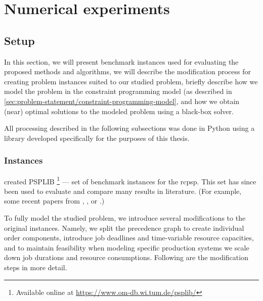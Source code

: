 \chapter{Numerical experiments} \label{chap:numerical-experiments}

\section{Setup} \label{sec:numerical-experiments/setup}

In this section, we will present benchmark instances used for evaluating the proposed methods and algorithms,
we will describe the modification process for creating problem instances suited to our studied problem,
briefly describe how we model the problem in the constraint programming model
(as described in \cref{sec:problem-statement/constraint-programming-model},
and how we obtain (near) optimal solutions to the modeled problem using a black-box solver.

All processing described in the following subsections was done in Python using a library
developed specifically for the purposes of this thesis. 

\subsection{Instances} \label{subsec:numerical-experiments/setup/instances}

\citet{Kolisch1997} created PSPLIB%
\footnote{Available online at \url{https://www.om-db.wi.tum.de/psplib/}}
--- set of benchmark instances for the \ac{rcpsp}.
This set has since been used to evaluate and compare many results in literature.
(For example, some recent papers from \citet{Bianco2011}, \citet{Cheng2015}, or \citet{Elsayed2017}.)


To fully model the studied problem, we introduce several modifications to the original instances.
Namely, we split the precedence graph to create individual order components,
introduce job deadlines and time-variable resource capacities,
and to maintain feasibility when modeling specific production systems
we scale down job durations and resource consumptions.
Following are the modification steps in more detail.

